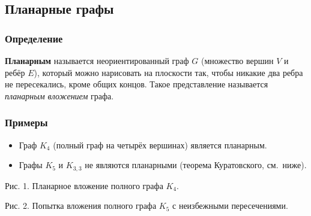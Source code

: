 \subsection{Планарные графы}

\subsubsection{Определение}

\textbf{Планарным} называется неориентированный граф $G$ (множество вершин $V$ и ребёр $E$), который можно нарисовать на плоскости так, чтобы никакие два ребра не пересекались, кроме общих концов. Такое представление называется \emph{планарным вложением} графа.

\subsubsection{Примеры}

\begin{itemize}[leftmargin=*]
  \item Граф $K_4$ (полный граф на четырёх вершинах) является планарным.
  \item Графы $K_5$ и $K_{3,3}$ не являются планарными (теорема Куратовского, см.~ниже).
\end{itemize}


\begin{center}

\small Рис. 1. Планарное вложение полного графа $K_4$.
\end{center}


\begin{center}

\small Рис. 2. Попытка вложения полного графа $K_5$ с неизбежными пересечениями.
\end{center}

